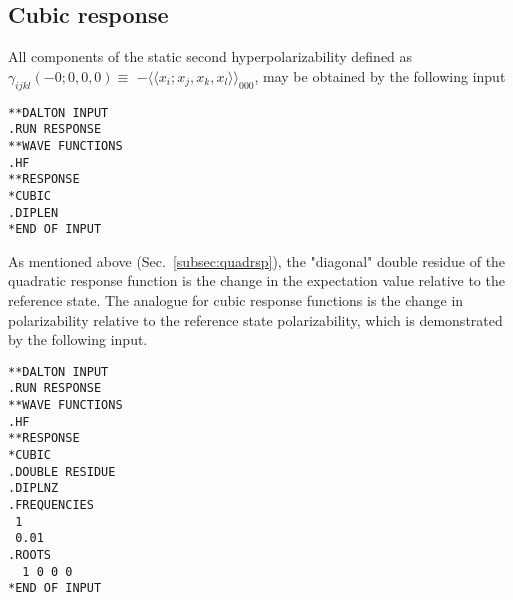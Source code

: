 \subsection{Cubic response}
\label{subsec:cubrsp}

\begin{center}
\end{center}

All components of the static second hyperpolarizability
defined as $\gamma_{ijkl}(-0;0,0,0)\equiv$
$-\langle\!\langle x_i;x_j,x_k,x_l\rangle\!\rangle_{000}$,
 may be obtained by the following input

\begin{verbatim}
**DALTON INPUT
.RUN RESPONSE
**WAVE FUNCTIONS
.HF
**RESPONSE
*CUBIC
.DIPLEN
*END OF INPUT
\end{verbatim}



As  mentioned above (Sec.~\ref{subsec:quadrsp}), the "diagonal" 
double residue of the quadratic
response function is the change in the expectation value relative to the
reference state. The analogue for cubic
response functions is the change in
polarizability relative to the
reference state polarizability, which is demonstrated by the following
input.
\begin{verbatim}
**DALTON INPUT
.RUN RESPONSE
**WAVE FUNCTIONS
.HF
**RESPONSE
*CUBIC
.DOUBLE RESIDUE
.DIPLNZ
.FREQUENCIES
 1
 0.01
.ROOTS
  1 0 0 0
*END OF INPUT
\end{verbatim}



